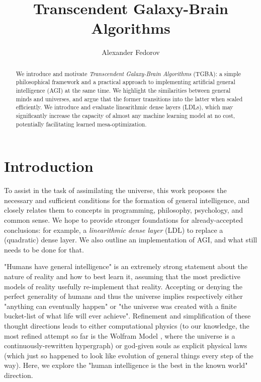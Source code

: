 \documentclass{article}
\begin{document}
\title{Transcendent Galaxy-Brain Algorithms}
\author{Alexander Fedorov}
\date{}

\maketitle

\begin{abstract}

We introduce and motivate \textit{Transcendent Galaxy-Brain Algorithms} (TGBA): a simple philosophical framework and a practical approach to implementing artificial general intelligence (AGI) at the same time. We highlight the similarities between general minds and universes, and argue that the former transitions into the latter when scaled efficiently. We introduce and evaluate linearithmic dense layers (LDLs), which may significantly increase the capacity of almost any machine learning model at no cost, potentially facilitating learned mesa-optimization.

\end{abstract}

\section{Introduction}

To assist in the task of assimilating the universe, this work proposes the necessary and sufficient conditions for the formation of general intelligence, and closely relates them to concepts in programming, philosophy, psychology, and common sense. We hope to provide stronger foundations for already-accepted conclusions: for example, a \textit{linearithmic dense layer} (LDL) to replace a (quadratic) dense layer. We also outline an implementation of AGI, and what still needs to be done for that.

"Humans have general intelligence" is an extremely strong statement about the nature of reality and how to best learn it, assuming that the most predictive models of reality usefully re-implement that reality. Accepting or denying the perfect generality of humans and thus the universe implies respectively either "anything can eventually happen" or "the universe was created with a finite bucket-list of what life will ever achieve". Refinement and simplification of these thought directions leads to either computational physics (to our knowledge, the most refined attempt so far is the Wolfram Model \cite{Wolfram_2020}, where the universe is a continuously-rewritten hypergraph) or god-given souls as explicit physical laws (which just so happened to look like evolution of general things every step of the way). Here, we explore the "human intelligence is the best in the known world" direction.
\end{document}
